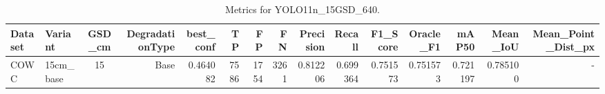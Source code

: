 \begin{table}
\caption{Metrics for YOLO11n_15GSD_640.}
\label{tab:rq1_results}
\begin{tabular}{llcrrrrrrrrrrrr}
\toprule
Dataset & Variant & GSD_cm & DegradationType & best_conf & TP & FP & FN & Precision & Recall & F1_Score & Oracle_F1 & mAP50 & Mean_IoU & Mean_Point_Dist_px \\
\midrule
COWC & 15cm_base & 15 & Base & 0.464082 & 7586 & 1754 & 3261 & 0.812206 & 0.699364 & 0.751573 & 0.751573 & 0.721197 & 0.785100 & - \\
\bottomrule
\end{tabular}
\end{table}
